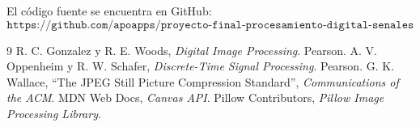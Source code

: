 \documentclass[12pt,letterpaper]{article}
\begin{document}
El código fuente se encuentra en GitHub:
\[
\texttt{https://github.com/apoapps/proyecto-final-procesamiento-digital-senales}
\]

\begin{thebibliography}{9}
 R. C. Gonzalez y R. E. Woods, \textit{Digital Image Processing}. Pearson.
 A. V. Oppenheim y R. W. Schafer, \textit{Discrete-Time Signal Processing}. Pearson.
 G. K. Wallace, ``The JPEG Still Picture Compression Standard'', \textit{Communications of the ACM}.
 MDN Web Docs, \textit{Canvas API}.
 Pillow Contributors, \textit{Pillow Image Processing Library}.
\end{thebibliography}
\end{document}
